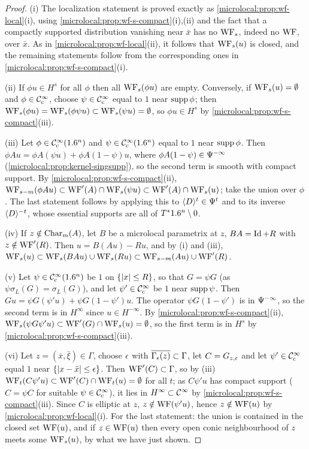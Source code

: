 \begin{proof}
  (i) The localization statement is proved exactly as
  \cref{microlocal:prop:wf-local}(i), using
  \cref{microlocal:prop:wf-s-compact}(i),(ii) and the fact that a compactly
  supported distribution vanishing near $\bar x$ has no $\operatorname{WF}_s$, indeed no $\operatorname{WF}$,
  over $\bar x$. As in \cref{microlocal:prop:wf-local}(ii), it follows that
  $\operatorname{WF}_s(u)$ is closed, and the remaining statements follow from the
  corresponding ones in \cref{microlocal:prop:wf-s-compact}(i).

  (ii) If $\phi u\in H^s$ for all $\phi$ then all $\operatorname{WF}_s(\phi u)$ are empty.
  Conversely, if $\operatorname{WF}_s(u)=\emptyset$ and $\phi\in\mathcal{C}^\infty_{\mathrm{c}}$, choose
  $\psi\in\mathcal{C}^\infty_{\mathrm{c}}$ equal to $1$ near $\operatorname{supp}\phi$; then
  $\operatorname{WF}_s(\phi u)=\operatorname{WF}_s(\phi\psi u)\subset\operatorname{WF}_s(\psi u)=\emptyset$, so
  $\phi u\in H^s$ by \cref{microlocal:prop:wf-s-compact}(iii).

  (iii) Let $\phi\in\mathcal{C}^\infty_{\mathrm{c}}(1.6^n)$ and $\psi\in\mathcal{C}^\infty_{\mathrm{c}}(1.6^n)$ equal to $1$ near
  $\operatorname{supp}\phi$. Then $\phi Au=\phi A(\psi u)+\phi A(1-\psi)u$, where
  $\phi A(1-\psi)\in\Psi^{-\infty}$ (\cref{microlocal:prop:kernel-singsupp}),
  so the second term is smooth with compact support. By
  \cref{microlocal:prop:wf-s-compact}(ii),
  $\operatorname{WF}_{s-m}(\phi Au)\subset\operatorname{WF}'(A)\cap\operatorname{WF}_s(\psi u)\subset\operatorname{WF}'(A)\cap\operatorname{WF}_s(u)$;
  take the union over $\phi$. The last statement follows by applying this to
  $\langle D\rangle^t\in\Psi^{t}$ and to its inverse $\langle D\rangle^{-t}$, whose essential
  supports are all of $T^*1.6^n\setminus0$.

  (iv) If $z\notin\operatorname{Char}_m(A)$, let $B$ be a microlocal parametrix at $z$,
  $BA=\operatorname{Id}+R$ with $z\notin\operatorname{WF}'(R)$. Then $u=B(Au)-Ru$, and by (i) and (iii),
  $\operatorname{WF}_s(u)\subset\operatorname{WF}_{s}(BAu)\cup\operatorname{WF}_s(Ru)\subset\operatorname{WF}_{s-m}(Au)\cup\operatorname{WF}'(R)$.

  (v) Let $\psi\in\mathcal{C}^\infty_{\mathrm{c}}(1.6^n)$ be $1$ on $\{\lvert x\rvert\le R\}$, so that
  $G=\psi G$ (as $\psi\sigma_L(G)=\sigma_L(G)$), and let $\psi'\in\mathcal{C}^\infty_{\mathrm{c}}$ be $1$
  near $\operatorname{supp}\psi$. Then $Gu=\psi G(\psi'u)+\psi G(1-\psi')u$. The operator
  $\psi G(1-\psi')$ is in $\Psi^{-\infty}$, so the second term is in
  $H^\infty$ since $u\in H^{-\infty}$. By
  \cref{microlocal:prop:wf-s-compact}(ii),
  $\operatorname{WF}_s(\psi G\psi'u)\subset\operatorname{WF}'(G)\cap\operatorname{WF}_s(u)=\emptyset$, so the first term is
  in $H^s$ by \cref{microlocal:prop:wf-s-compact}(iii).

  (vi) Let $z=(\bar x,\bar\xi)\in\Gamma$, choose $\epsilon$ with
  $\overline{\Gamma_\epsilon(z)}\subset\Gamma$, let $C=G_{z,\epsilon}$ and let
  $\psi'\in\mathcal{C}^\infty_{\mathrm{c}}$ equal $1$ near $\{\lvert x-\bar x\rvert\le\epsilon\}$. Then
  $\operatorname{WF}'(C)\subset\Gamma$, so by (iii)
  $\operatorname{WF}_t(C\psi'u)\subset\operatorname{WF}'(C)\cap\operatorname{WF}_t(u)=\emptyset$ for all $t$; as
  $C\psi'u$ has compact support ($C=\psi C$ for suitable $\psi\in\mathcal{C}^\infty_{\mathrm{c}}$), it lies
  in $H^\infty\subset\mathcal{C}^\infty$ by \cref{microlocal:prop:wf-s-compact}(iii). Since $C$
  is elliptic at $z$, $z\notin\operatorname{WF}(\psi'u)$, hence $z\notin\operatorname{WF}(u)$ by
  \cref{microlocal:prop:wf-local}(i). For the last statement: the union is
  contained in the closed set $\operatorname{WF}(u)$, and if $z\in\operatorname{WF}(u)$ then every open
  conic neighbourhood of $z$ meets some $\operatorname{WF}_s(u)$, by what we have just shown.
\end{proof}

